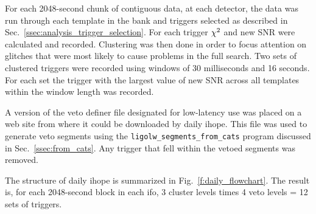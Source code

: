 For each 2048-second chunk of contiguous data, at each detector, the
data was run through each template in the bank and triggers selected
as described in Sec.~\ref{ssec:analysis_trigger_selection}. For each
trigger $\chi^2$ and new SNR were calculated and recorded.  Clustering
was then done in order to focus attention on glitches that were most
likely to cause problems in the full search.  Two sets of clustered
triggers were recorded using windows of 30 milliseconds and 16
seconds.  For each set the trigger with the largest value of new SNR
across all templates within the window length was recorded.

A version of the veto definer file designated for low-latency use  was
placed on a web site from where it could be downloaded by daily ihope.
This file was used to generate veto segments using the
\verb|ligolw_segments_from_cats| program discussed in
Sec.~\ref{ssec:from_cats}.  Any trigger that fell within the vetoed
segments was removed.

The structure of daily ihope is summarized in
Fig.~\ref{f:daily_flowchart}.  The result is, for each 2048-second
block in each ifo, 3 cluster levels times 4 veto levels = 12 sets of
triggers.

